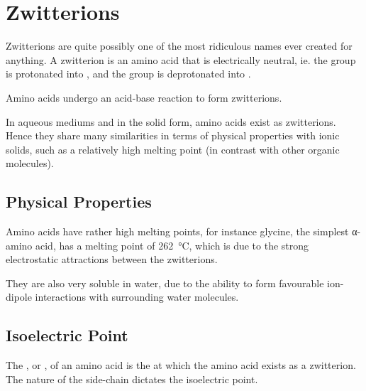 


	\pagebreak
	\section{Zwitterions}

		Zwitterions are quite possibly one of the most ridiculous names ever created for anything. A zwitterion is an amino acid that is
		electrically neutral, ie. the  group is protonated into , and the  group is deprotonated into .

		Amino acids undergo an  acid-base reaction to form zwitterions.


		In aqueous mediums and in the solid form, amino acids exist as zwitterions. Hence they share many similarities in terms of physical
		properties with ionic solids, such as a relatively high melting point (in contrast with other organic molecules).


		\subsection{Physical Properties}

			Amino acids have rather high melting points, for instance glycine, the simplest α-amino acid, has a melting point of
			\SI{262}{\celsius}, which is due to the strong electrostatic attractions between the zwitterions.

			They are also very soluble in water, due to the ability to form favourable ion-dipole interactions with surrounding water
			molecules.



		\subsection{Isoelectric Point}

			The , or \pI{}, of an amino acid is the \pH{} at which the amino acid exists as a
			zwitterion. The nature of the side-chain dictates the isoelectric point.

